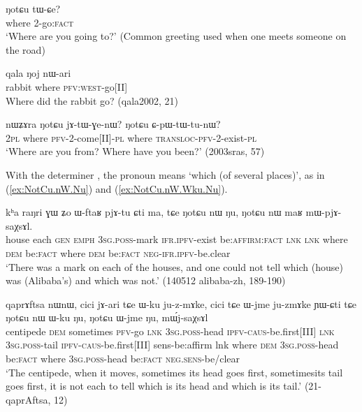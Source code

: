 \begin{exe}
\ex \label{ex:NotCu.tWCe}
\gll   ŋotɕu tɯ-ɕe? \\
 where 2-go:\textsc{fact} \\
\glt `Where are you going to?' (Common greeting used when one meets someone on the road)
 \end{exe} 
 
\begin{exe}
\ex \label{ex:Noj.nari}
\gll     qala ŋoj nɯ-ari  \\
  rabbit where \textsc{pfv:west}-go[II] \\
\glt Where did the rabbit go?  (qala2002, 21)
\end{exe} 

\begin{exe}
\ex \label{ex:NotCu.jAtWGenW}
\gll  nɯʑɤra ŋotɕu jɤ-tɯ-ɣe-nɯ? ŋotɕu ɕ-pɯ-tɯ-tu-nɯ? \\
\textsc{2pl} where \textsc{pfv}-2-come[II]-\textsc{pl} where \textsc{transloc-pfv}-2-exist-\textsc{pl} \\
\glt `Where are you from? Where have you been?' (2003sras, 57)
\end{exe} 

With the determiner , the pronoun  means `which (of several places)', as in (\ref{ex:NotCu.nW.Nu}) and (\ref{ex:NotCu.nW.Wku.Nu}).

\begin{exe}
\ex \label{ex:NotCu.nW.Nu}
\gll kʰa raŋri ɣɯ ʑo ɯ-ftaʁ pjɤ-tu ɕti ma, tɕe ŋotɕu nɯ ŋu, ŋotɕu nɯ maʁ mɯ-pjɤ-saχsɤl. \\
house each \textsc{gen} \textsc{emph} \textsc{3sg.poss}-mark \textsc{ifr.ipfv}-exist be:\textsc{affirm:fact} \textsc{lnk} \textsc{lnk} where \textsc{dem} be:\textsc{fact}  where \textsc{dem} be:\textsc{fact} \textsc{neg-ifr.ipfv}-be.clear \\
\glt `There was a mark on each of the houses, and one could not tell which (house) was (Alibaba's) and which was not.' (140512 alibaba-zh, 189-190)
\end{exe} 

\begin{exe}
\ex \label{ex:NotCu.nW.Wku.Nu}
\gll qaprɤftsa nɯnɯ, cici jɤ-ari tɕe ɯ-ku ju-z-mɤke, cici tɕe ɯ-jme ju-zmɤke ɲɯ-ɕti tɕe
ŋotɕu nɯ ɯ-ku ŋu, ŋotɕu ɯ-jme ŋu, mɯ́j-saχsɤl \\
centipede \textsc{dem} sometimes \textsc{pfv}-go \textsc{lnk} \textsc{3sg.poss}-head \textsc{ipfv-caus}-be.first[III] \textsc{lnk} \textsc{3sg.poss}-tail \textsc{ipfv-caus}-be.first[III] sens-be:affirm lnk where \textsc{dem} \textsc{3sg.poss}-head be:\textsc{fact} where \textsc{3sg.poss}-head be:\textsc{fact} \textsc{neg.sens}-be/clear \\
\glt `The centipede, when it moves, sometimes its head goes first, sometimesits tail goes first, it is not each to tell which is its head and which is its tail.' (21-qaprAftsa, 12)
\end{exe} 


